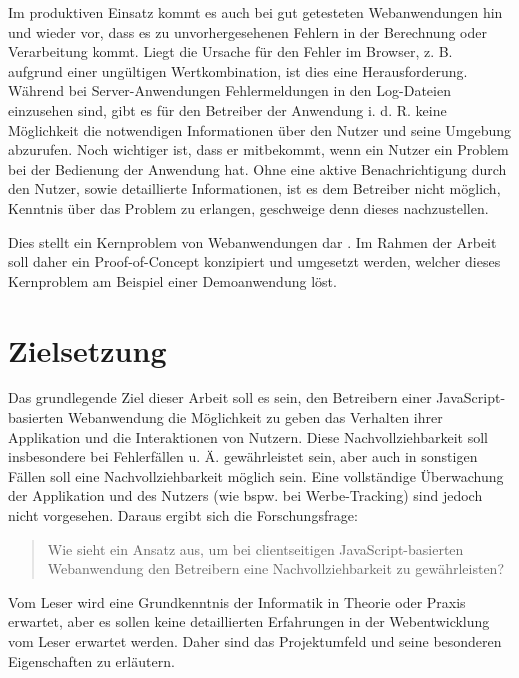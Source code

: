 Im produktiven Einsatz kommt es auch bei gut getesteten Webanwendungen hin und wieder vor, dass es zu unvorhergesehenen Fehlern in der Berechnung oder Verarbeitung kommt. Liegt die Ursache für den Fehler im Browser, z. B. aufgrund einer ungültigen Wertkombination, ist dies eine Herausforderung. Während bei Server-Anwendungen Fehlermeldungen in den Log-Dateien einzusehen sind, gibt es für den Betreiber der Anwendung i. d. R. keine Möglichkeit die notwendigen Informationen über den Nutzer und seine Umgebung abzurufen. Noch wichtiger ist, dass er mitbekommt, wenn ein Nutzer ein Problem bei der Bedienung der Anwendung hat. Ohne eine aktive Benachrichtigung durch den Nutzer, sowie detaillierte Informationen, ist es dem Betreiber nicht möglich, Kenntnis über das Problem zu erlangen, geschweige denn dieses nachzustellen.

Dies stellt ein Kernproblem von  Webanwendungen dar \cite{ClientSideMonitoringOfDistributedSystems}. Im Rahmen der Arbeit soll daher ein Proof-of-Concept konzipiert und umgesetzt werden, welcher dieses Kernproblem am Beispiel einer Demoanwendung löst.

\section{Zielsetzung}

Das grundlegende Ziel dieser Arbeit soll es sein, den Betreibern einer JavaScript-basierten Webanwendung die Möglichkeit zu geben das Verhalten ihrer Applikation und die Interaktionen von Nutzern. Diese Nachvollziehbarkeit soll insbesondere bei Fehlerfällen u. Ä. gewährleistet sein, aber auch in sonstigen Fällen soll eine Nachvollziehbarkeit möglich sein. Eine vollständige Überwachung der Applikation und des Nutzers (wie bspw. bei Werbe-Tracking) sind jedoch nicht vorgesehen. Daraus ergibt sich die Forschungsfrage:

\begin{quotation}
	Wie sieht ein Ansatz aus, um bei clientseitigen JavaScript-basierten Webanwendung den Betreibern eine Nachvollziehbarkeit zu gewährleisten?
\end{quotation}

Vom Leser wird eine Grundkenntnis der Informatik in Theorie oder Praxis erwartet, aber es sollen keine detaillierten Erfahrungen in der Webentwicklung vom Leser erwartet werden. Daher sind das Projektumfeld und seine besonderen Eigenschaften zu erläutern.

